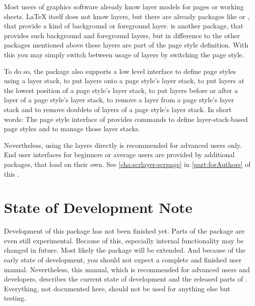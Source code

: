 Most users of graphics software already know layer models for pages or working
sheets. \LaTeX{} itself does not know layers, but there are already packages
like  or , that provide a kind of
background or foreground layer.  is another package,
that provides such background and foreground layers, but in difference
to the other packages mentioned above these layers are part of the
page style definition. With this you may simply switch between usage
of layers by switching the page style.

To do so, the package also supports a low level interface to define page
styles using a layer stack, to put layers onto a page style's layer stack, to
put layers at the lowest position of a page style's layer stack, to put layers
before or after a layer of a page style's layer stack, to remove a layer from
a page style's layer stack and to remove doublets of layers of a page style's
layer stack. In short words: The page style interface of 
provides commands to define layer-stack-based page styles and to manage those
layer stacks.

Nevertheless, using the layers directly is recommended for advanced users only.
End user interfaces for beginners or average users are provided by additional
packages, that load  on their own. See
\autoref{cha:scrlayer-scrpage} in \autoref{part:forAuthors} of this
.

\section{State of Development Note}
\label{sec:scrlayer.draft}

Development of this package has not been finished yet. Parts of the package
are even still experimental. Because of this, especially internal
functionality may be changed in future. Most likely the package will be
extended. And because of the early state of development, you should not expect
a complete and finished user manual. Nevertheless, this manual, which is
recommended for advanced users and developers, describes the current state of
development and the released parts of . Everything, not
documented here, should not be used for anything else but testing.



